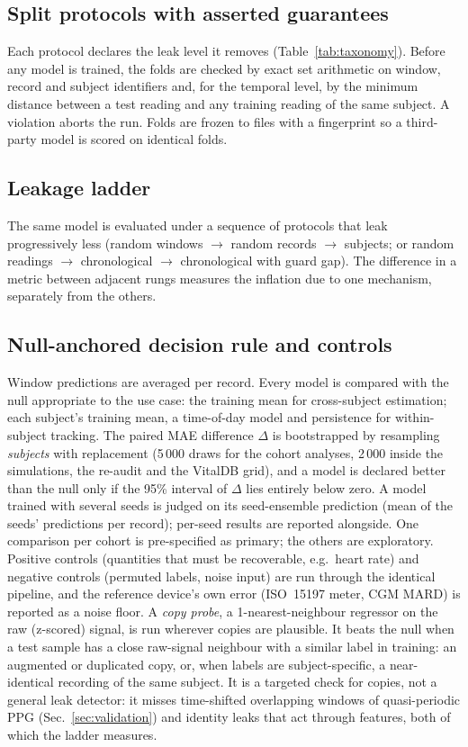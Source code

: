 \documentclass[journal]{IEEEtran}
\begin{document}
\subsection{Split protocols with asserted guarantees}
Each protocol declares the leak level it removes (Table~\ref{tab:taxonomy}).
Before any model is trained, the folds are checked by exact set arithmetic on
window, record and subject identifiers and, for the temporal level, by the
minimum distance between a test reading and any training reading of the same
subject.  A violation aborts the run.  Folds are frozen to files with a
fingerprint so a third-party model is scored on identical folds.

\subsection{Leakage ladder}
The same model is evaluated under a sequence of protocols that leak
progressively less (random windows $\to$ random records $\to$ subjects; or
random readings $\to$ chronological $\to$ chronological with guard gap).  The
difference in a metric between adjacent rungs measures the inflation due to
one mechanism, separately from the others.

\subsection{Null-anchored decision rule and controls}
\label{sec:rule}
Window predictions are averaged per record.  Every model is compared with the
null appropriate to the use case: the training mean for cross-subject
estimation; each subject's training mean, a time-of-day model and persistence
for within-subject tracking.  The paired MAE difference $\Delta$ is bootstrapped
by resampling \emph{subjects} with replacement (5\,000 draws for the cohort
analyses, 2\,000 inside the simulations, the re-audit and the VitalDB grid),
and a model is declared better than the null only if the 95\% interval of
$\Delta$ lies entirely below zero.  A model trained with several seeds is
judged on its seed-ensemble prediction (mean of the seeds' predictions per
record); per-seed results are reported alongside.  One comparison per cohort is pre-specified as primary;
the others are exploratory.  Positive controls (quantities that must be
recoverable, e.g.\ heart rate) and negative controls (permuted labels,
noise input) are run through the identical pipeline, and the reference
device's own error (ISO~15197 meter, CGM MARD) is reported as a noise floor.
A \emph{copy probe}, a 1-nearest-neighbour regressor on the raw
(z-scored) signal, is run wherever copies are plausible.  It beats the null
when a test sample has a close raw-signal neighbour with a similar label in
training: an augmented or duplicated copy, or, when labels are
subject-specific, a near-identical recording of the same subject.  It is a
targeted check for copies, not a general leak detector: it misses
time-shifted overlapping windows of quasi-periodic PPG (Sec.~\ref{sec:validation})
and identity leaks that act through features, both of which the ladder
measures.
\end{document}
